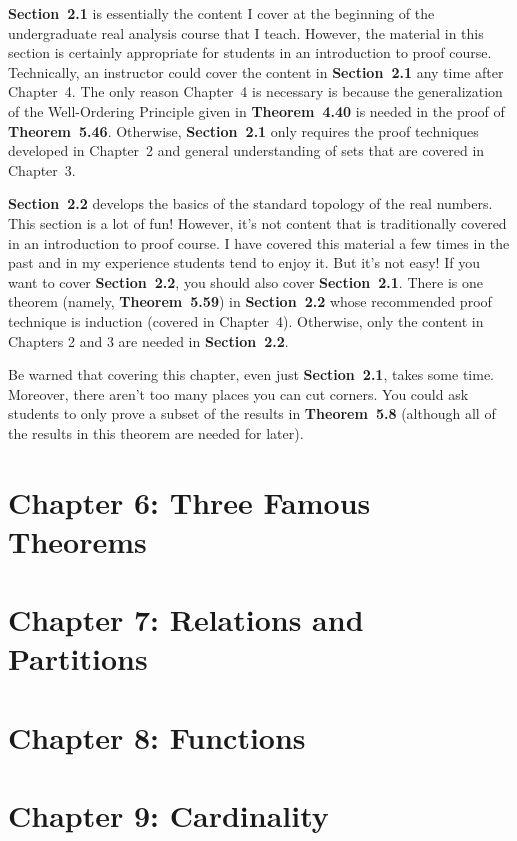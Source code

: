 \documentclass[11pt]{article}%
\newcommand{\blankline}{\pagebreak[2]\vspace{.5\baselineskip}}
\begin{document}
\blankline

\textbf{Section~2.1} is essentially the content I cover at the beginning of the undergraduate real analysis course that I teach.  However, the material in this section is certainly appropriate for students in an introduction to proof course. Technically, an instructor could cover the content in \textbf{Section~2.1} any time after Chapter~4.  The only reason Chapter~4 is necessary is because the generalization of the Well-Ordering Principle given in \textbf{Theorem~4.40} is needed in the proof of \textbf{Theorem~5.46}.   Otherwise, \textbf{Section~2.1} only requires the proof techniques developed in Chapter~2 and general understanding of sets that are covered in Chapter~3.

\blankline

\textbf{Section~2.2} develops the basics of the standard topology of the real numbers.  This section is a lot of fun!  However, it's not content that is traditionally covered in an introduction to proof course.  I have covered this material a few times in the past and in my experience students tend to enjoy it.  But it's not easy!  If you want to cover \textbf{Section~2.2}, you should also cover \textbf{Section~2.1}.  There is one theorem (namely, \textbf{Theorem~5.59}) in \textbf{Section~2.2} whose recommended proof technique is induction (covered in Chapter~4).  Otherwise, only the content in Chapters 2 and 3 are needed in \textbf{Section~2.2}.

\blankline

Be warned that covering this chapter, even just \textbf{Section~2.1}, takes some time.  Moreover, there aren't too many places you can cut corners.  You could ask students to only prove a subset of the results in \textbf{Theorem~5.8} (although all of the results in this theorem are needed for later).


\section*{Chapter 6: Three Famous Theorems}


\section*{Chapter 7: Relations and Partitions}


\section*{Chapter 8: Functions}


\section*{Chapter 9: Cardinality}
\end{document}

